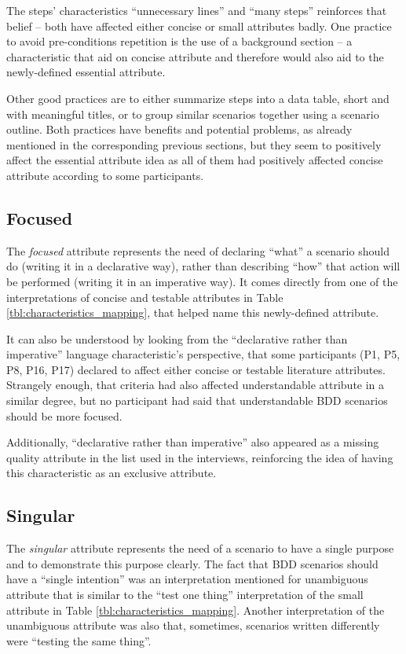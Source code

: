 The steps' characteristics ``unnecessary lines'' and ``many steps'' reinforces that belief -- both have affected either concise or small attributes badly. One practice to avoid pre-conditions repetition is the use of a background section -- a characteristic that aid on concise attribute and therefore would also aid to the newly-defined essential attribute. 

Other good practices are to either summarize steps into a data table, short and with meaningful titles, or to group similar scenarios together using a scenario outline. Both practices have benefits and potential problems, as already mentioned in the corresponding previous sections, but they seem to positively affect the essential attribute idea as all of them had positively affected concise attribute according to some participants.

\subsection{Focused}

The \textit{focused} attribute represents the need of declaring ``what'' a scenario should do (writing it in a declarative way), rather than describing ``how'' that action will be performed (writing it in an imperative way). It comes directly from one of the interpretations of concise and testable attributes in Table \ref{tbl:characteristics_mapping}, that helped name this newly-defined attribute.

It can also be understood by looking from the ``declarative rather than imperative'' language characteristic's perspective, that some participants (P1, P5, P8, P16, P17) declared to affect either concise or testable literature attributes. Strangely enough, that criteria had also affected understandable attribute in a similar degree, but no participant had said that understandable BDD scenarios should be more focused. 

Additionally, ``declarative rather than imperative'' also appeared as a missing quality attribute in the list used in the interviews, reinforcing the idea of having this characteristic as an exclusive attribute.

\subsection{Singular}

The \textit{singular} attribute represents the need of a scenario to have a single purpose and to demonstrate this purpose clearly. The fact that BDD scenarios should have a ``single intention'' was an interpretation mentioned for unambiguous attribute that is similar to the ``test one thing'' interpretation of the small attribute in Table \ref{tbl:characteristics_mapping}. Another interpretation of the unambiguous attribute was also that, sometimes, scenarios written differently were ``testing the same thing''. 

